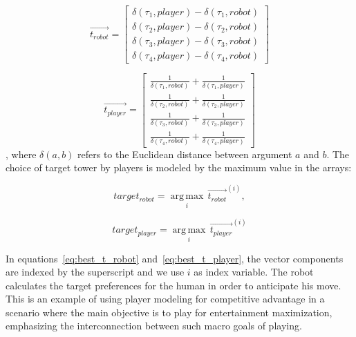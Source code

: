 \begin{equation}
    \overrightarrow{t_{robot}} = \begin{bmatrix}
    \delta(\tau_{1},player) -\delta(\tau_{1},robot)  \\ 
    \delta(\tau_{2},player) - \delta(\tau_{2},robot)  \\
    \delta(\tau_{3},player) - \delta(\tau_{3},robot) \\
    \delta(\tau_{4},player) - \delta(\tau_{4},robot)
    \end{bmatrix}
    \label{eq:array1}
\end{equation}

\begin{equation}
\overrightarrow{t_{player}} = \begin{bmatrix}
\frac{1}{\delta(\tau_{1},robot)} + \frac{1}{\delta(\tau_{1},player)} \\ 
\frac{1}{\delta(\tau_{2},robot)} + \frac{1}{\delta(\tau_{2},player)}  \\
\frac{1}{\delta(\tau_{3},robot)} + \frac{1}{\delta(\tau_{3},player)}  \\
\frac{1}{\delta(\tau_{4},robot)} + \frac{1}{\delta(\tau_{4},player)} 
\end{bmatrix}
\label{eq:array2}
\end{equation}
, where $\delta(a,b)$ refers to the Euclidean distance between argument $a$ and $b$. The choice of target tower by players is modeled by the maximum value in the arrays:

\begin{equation} \label{eq:best_t_robot}
    target_{robot} = \operatorname*{arg\,max}_i \, \overrightarrow{t_{robot}}^{(i)}, 
\end{equation}

\begin{equation} \label{eq:best_t_player}
target_{player} = \operatorname*{arg\,max}_i \, \overrightarrow{t_{player}}^{(i)}
\end{equation}

In equations~\ref{eq:best_t_robot} and~\ref{eq:best_t_player}, the vector components are indexed by the superscript and we use $i$ as index variable. The robot calculates the target preferences for the human in order to anticipate his move. This is an example of using player modeling for competitive advantage in a scenario where the main objective is to play for entertainment maximization, emphasizing the interconnection between such macro goals of playing.


